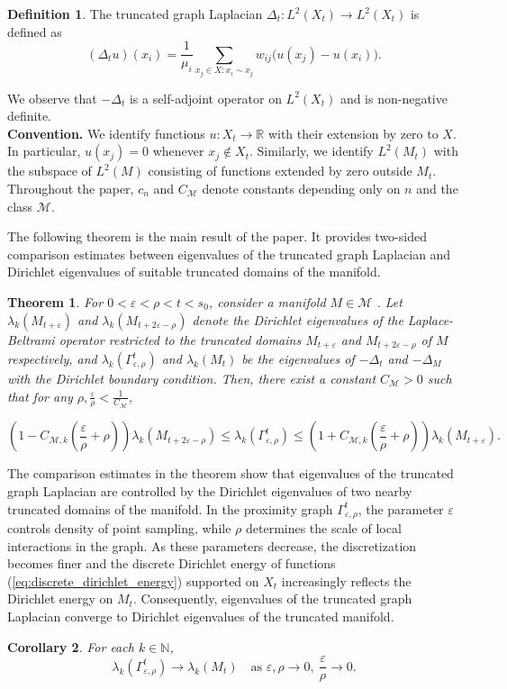 \documentclass[10 pt, reqno]{amsart}
\newcommand{\M}{\mathcal{M}}
\newcommand{\lk}{\lambda_k}%
\newtheorem{theorem}{Theorem}[section]
\newtheorem{corollary}[theorem]{Corollary}
\theoremstyle{definition}
\newtheorem{definition}{Definition}
\numberwithin{equation}{section}
\begin{document}
\begin{definition}
 The truncated graph Laplacian $\Delta_t: L^2(X_t)\rightarrow L^2(X_t)$ is defined as
\[
(\Delta_t u)(x_i)
=
\frac{1}{\mu_i}
\sum_{x_j\in X: x_i\sim x_j} w_{ij}\big(u(x_j)-u(x_i)\big).
\]
\end{definition}
We observe that $-\Delta_t$ is a self-adjoint operator on $L^2(X_t)$ and is non-negative definite.  \\
\textbf{Convention.}
We identify functions $u : X_t \to \mathbb{R}$ with their extension by zero to $X$. In particular, $u(x_j)=0$ whenever $x_j \notin X_t$. Similarly, we identify $L^2(M_t)$ with the subspace of $L^2(M)$ consisting of functions extended by zero outside $M_t$. Throughout the paper, $c_n$ and $C_{\mathcal{M}}$ denote constants depending only on $n$ and the class $\mathcal{M}$.

\par The following theorem is the main result of the paper. It provides two-sided comparison estimates between eigenvalues of the truncated graph Laplacian and Dirichlet eigenvalues of suitable truncated
domains of the manifold.


\begin{theorem}
\label{thm:main}
For $0 < \varepsilon < \rho < t < s_0$,  consider a manifold $M\in \M$ . Let $\lk(M_{t+\varepsilon})$ and $\lk(M_{t+2\varepsilon-\rho})$ denote the Dirichlet eigenvalues of the Laplace-Beltrami operator restricted to the truncated domains $M_{t+\varepsilon}$ and $M_{t+2\varepsilon-\rho}$ of $M$ respectively, and $\lk(\Gamma^t_{\varepsilon,\rho})$ and $\lk(M_t)$ be the eigenvalues of $-\Delta_t$ and $-\Delta_M$ with the Dirichlet boundary condition. Then, there exist a constant $C_\M>0$ such that for any $\rho,\frac{\varepsilon}{\rho}<\frac{1}{C_\M}$,


\[
\left(1-C_{\M,k}\left(\frac{\varepsilon}{\rho}+\rho\right)\right)\lk(M_{t+2\varepsilon-\rho})\le\lk(\Gamma^t_{\varepsilon,\rho})\le \left(1+C_{\M,k}\left(\frac{\varepsilon}{\rho}+\rho\right)\right)\lk(M_{t+\varepsilon}).
\]
\end{theorem}
The comparison estimates in the theorem show that eigenvalues of the truncated graph Laplacian are controlled by the Dirichlet eigenvalues of two nearby truncated domains of the manifold. In the proximity graph $\Gamma_{\varepsilon,\rho}^t$, the parameter $\varepsilon$ controls density of point sampling, while $\rho$ determines the scale of  local interactions in the graph. As these parameters decrease, the discretization becomes finer and the discrete Dirichlet energy of functions (\ref{eq:discrete_dirichlet_energy}) supported on $X_t$ increasingly reflects the Dirichlet energy on $M_t$. Consequently, eigenvalues of the truncated graph Laplacian converge to Dirichlet eigenvalues of the truncated manifold.
\begin{corollary}
\label{corollary}
For each $k\in\mathbb{N}$,
\[
\lambda_k(\Gamma_{\varepsilon,\rho}^t)\to\lambda_k(M_t)
\quad\text{as }\varepsilon,\rho\to0,\ \frac{\varepsilon}{\rho}\to0.
\]
\end{corollary}
\end{document}

